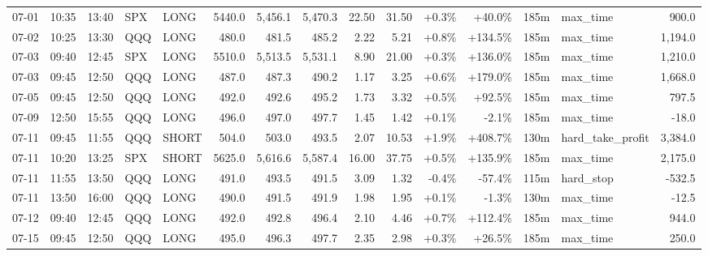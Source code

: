 \documentclass[11pt,a4paper,twoside]{article}
\begin{document}
\begin{landscape}
\begin{center}
\begin{longtable}{>{\color{txtmain}}l l l l l r r r r r r r r >{\color{txtmain}}l r}
07-01 & 10:35 & 13:40 & SPX & LONG & 5440.0 & 5,456.1 & 5,470.3 & 22.50 & 31.50 & \textcolor{wingreen}{+0.3\%} & \textcolor{wingreen}{+40.0\%} & 185m & max\_time & \textcolor{wingreen}{900.0} \\
07-02 & 10:25 & 13:30 & QQQ & LONG & 480.0 & 481.5 & 485.2 & 2.22 & 5.21 & \textcolor{wingreen}{+0.8\%} & \textcolor{wingreen}{+134.5\%} & 185m & max\_time & \textcolor{wingreen}{1,194.0} \\
07-03 & 09:40 & 12:45 & SPX & LONG & 5510.0 & 5,513.5 & 5,531.1 & 8.90 & 21.00 & \textcolor{wingreen}{+0.3\%} & \textcolor{wingreen}{+136.0\%} & 185m & max\_time & \textcolor{wingreen}{1,210.0} \\
07-03 & 09:45 & 12:50 & QQQ & LONG & 487.0 & 487.3 & 490.2 & 1.17 & 3.25 & \textcolor{wingreen}{+0.6\%} & \textcolor{wingreen}{+179.0\%} & 185m & max\_time & \textcolor{wingreen}{1,668.0} \\
07-05 & 09:45 & 12:50 & QQQ & LONG & 492.0 & 492.6 & 495.2 & 1.73 & 3.32 & \textcolor{wingreen}{+0.5\%} & \textcolor{wingreen}{+92.5\%} & 185m & max\_time & \textcolor{wingreen}{797.5} \\
07-09 & 12:50 & 15:55 & QQQ & LONG & 496.0 & 497.0 & 497.7 & 1.45 & 1.42 & \textcolor{wingreen}{+0.1\%} & \textcolor{lossred}{-2.1\%} & 185m & max\_time & \textcolor{lossred}{-18.0} \\
07-11 & 09:45 & 11:55 & QQQ & SHORT & 504.0 & 503.0 & 493.5 & 2.07 & 10.53 & \textcolor{wingreen}{+1.9\%} & \textcolor{wingreen}{+408.7\%} & 130m & hard\_take\_profit & \textcolor{wingreen}{3,384.0} \\
07-11 & 10:20 & 13:25 & SPX & SHORT & 5625.0 & 5,616.6 & 5,587.4 & 16.00 & 37.75 & \textcolor{wingreen}{+0.5\%} & \textcolor{wingreen}{+135.9\%} & 185m & max\_time & \textcolor{wingreen}{2,175.0} \\
07-11 & 11:55 & 13:50 & QQQ & LONG & 491.0 & 493.5 & 491.5 & 3.09 & 1.32 & \textcolor{lossred}{-0.4\%} & \textcolor{lossred}{-57.4\%} & 115m & hard\_stop & \textcolor{lossred}{-532.5} \\
07-11 & 13:50 & 16:00 & QQQ & LONG & 490.0 & 491.5 & 491.9 & 1.98 & 1.95 & \textcolor{wingreen}{+0.1\%} & \textcolor{lossred}{-1.3\%} & 130m & max\_time & \textcolor{lossred}{-12.5} \\
07-12 & 09:40 & 12:45 & QQQ & LONG & 492.0 & 492.8 & 496.4 & 2.10 & 4.46 & \textcolor{wingreen}{+0.7\%} & \textcolor{wingreen}{+112.4\%} & 185m & max\_time & \textcolor{wingreen}{944.0} \\
07-15 & 09:45 & 12:50 & QQQ & LONG & 495.0 & 496.3 & 497.7 & 2.35 & 2.98 & \textcolor{wingreen}{+0.3\%} & \textcolor{wingreen}{+26.5\%} & 185m & max\_time & \textcolor{wingreen}{250.0} \\

\end{longtable}
\end{center}
\end{landscape}
\end{document}
